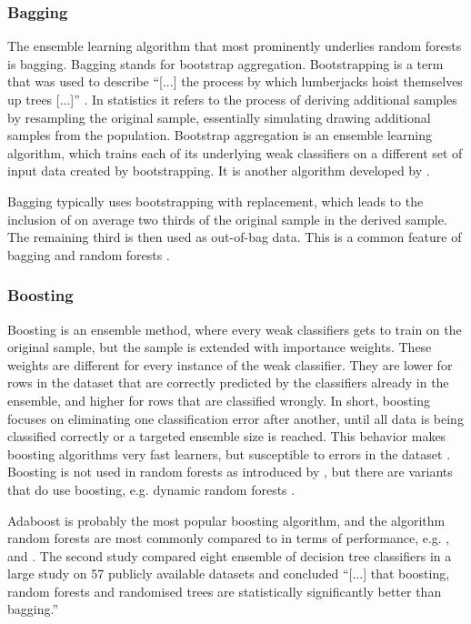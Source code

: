 \documentclass[a4paper,man,12pt,apacite,floatsintext]{apa6} %
\begin{document}
\subsubsection{Bagging}

The ensemble learning algorithm that most prominently underlies
random forests is bagging. Bagging stands for bootstrap aggregation.
Bootstrapping is a term that was used to describe
“[...] the process by which lumberjacks hoist themselves up trees [...]”
\cite{wpBOOT}.
In statistics it refers to the process of deriving additional samples
by resampling the original sample,
essentially simulating drawing additional samples from the population.
Bootstrap aggregation is an ensemble learning algorithm,
which trains each of its underlying weak classifiers on a different set
of input data created by bootstrapping.
It is another algorithm developed by .

Bagging typically uses bootstrapping with replacement,
which leads to the inclusion of on average two thirds of the original sample
in the derived sample.
The remaining third is then used as out-of-bag data.
This is a common feature of bagging and random forests \cite{breiman2001random}.

\subsubsection{Boosting}

Boosting is an ensemble method, where every weak classifiers gets to train
on the original sample, but the sample is extended with importance weights.
These weights are different for every instance of the weak classifier.
They are lower for rows in the dataset that are correctly predicted by
the classifiers already in the ensemble,
and higher for rows that are classified wrongly.
In short, boosting focuses on eliminating one classification error after
another, until all data is being classified correctly
or a targeted ensemble size is reached.
This behavior makes boosting algorithms very fast learners,
but susceptible to errors in the dataset \cite{long2010random}.
Boosting is not used in random forests as introduced by ,
but there are variants that do use boosting, e.g.
dynamic random forests \cite{bernard2012dynamic}.

Adaboost \cite{freund1995decision} is probably the most popular
boosting algorithm, and the algorithm random forests are most commonly
compared to in terms of performance, e.g. ,
 and .
The second study compared eight ensemble of decision tree classifiers in a
large study on 57 publicly available datasets and concluded
“[...] that boosting, random forests and randomised trees are
statistically significantly better than bagging.”
\end{document}

